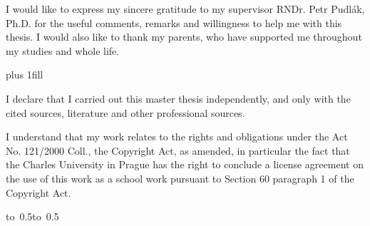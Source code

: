 \documentclass[12pt,a4paper]{report}
\begin{document}
\noindent
I would like to express my sincere gratitude to my supervisor RNDr. Petr Pudlák, Ph.D.
for the useful comments, remarks and willingness to help me with 
this thesis.
I would also like to thank my parents, who have supported me throughout
my studies and whole life. 

\newpage


\vglue 0pt plus 1fill

\noindent
I declare that I carried out this master thesis independently, and only with the cited
sources, literature and other professional sources.

\medskip\noindent
I understand that my work relates to the rights and obligations under the Act No.
121/2000 Coll., the Copyright Act, as amended, in particular the fact that the Charles
University in Prague has the right to conclude a license agreement on the use of this
work as a school work pursuant to Section 60 paragraph 1 of the Copyright Act.

\vspace{10mm}

\hbox{\hbox to 0.5\hbox to 0.5}

\vspace{20mm}
\newpage


\end{document}
